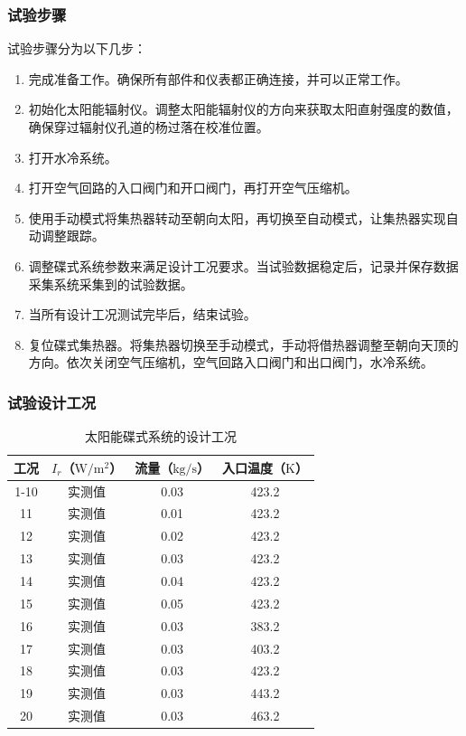 \subsubsection{试验步骤}
试验步骤分为以下几步：
\begin{enumerate}[label=(\arabic*)]
	\item 完成准备工作。确保所有部件和仪表都正确连接，并可以正常工作。
	\item 初始化太阳能辐射仪。调整太阳能辐射仪的方向来获取太阳直射强度的数值，确保穿过辐射仪孔道的杨过落在校准位置。
	\item 打开水冷系统。
	\item 打开空气回路的入口阀门和开口阀门，再打开空气压缩机。
	\item 使用手动模式将集热器转动至朝向太阳，再切换至自动模式，让集热器实现自动调整跟踪。
	\item 调整碟式系统参数来满足设计工况要求。当试验数据稳定后，记录并保存数据采集系统采集到的试验数据。
	\item 当所有设计工况测试完毕后，结束试验。 
	\item 复位碟式集热器。将集热器切换至手动模式，手动将借热器调整至朝向天顶的方向。依次关闭空气压缩机，空气回路入口阀门和出口阀门，水冷系统。
\end{enumerate}

\subsubsection{试验设计工况}

\begin{table}[htbp]\footnotesize
	\caption{太阳能碟式系统的设计工况}
	\begin{center}
	\begin{tabular}{cccc}
		\toprule
		工况	& $I_r$（$\mathrm{W/m^2}$）	&	流量（$\mathrm{kg/s}$）			&	入口温度（$\mathrm{K}$）\\
		\midrule
		1-10	&	实测值	&	0.03	&	423.2\\
		11	&	实测值	&	0.01	&	423.2\\
		12	&	实测值	&	0.02	&	423.2\\
		13	&	实测值	&	0.03	&	423.2\\
		14	&	实测值	&	0.04	&	423.2\\
		15	&	实测值	&	0.05	&	423.2\\
		16	&	实测值	&	0.03	&	383.2\\
		17	&	实测值	&	0.03	&	403.2\\
		18	&	实测值	&	0.03	&	423.2\\
		19	&	实测值	&	0.03	&	443.2\\
		20	&	实测值	&	0.03	&	463.2\\
		\bottomrule
	\end{tabular}
	\end{center}
	\label{tab:DesignedCasesForDish}
\end{table}

